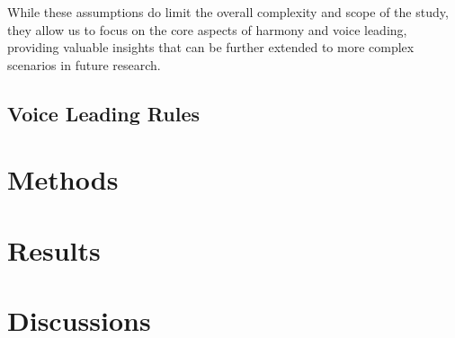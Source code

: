 \documentclass[12pt, letterpaper]{article}
\begin{document}
While these assumptions do limit the overall complexity and scope of the study, they allow us to focus on the core aspects of harmony and voice leading, providing valuable insights that can be further extended to more complex scenarios in future research.

\subsection{Voice Leading Rules}

\section{Methods}

\section{Results}

\section{Discussions}
\end{document}
